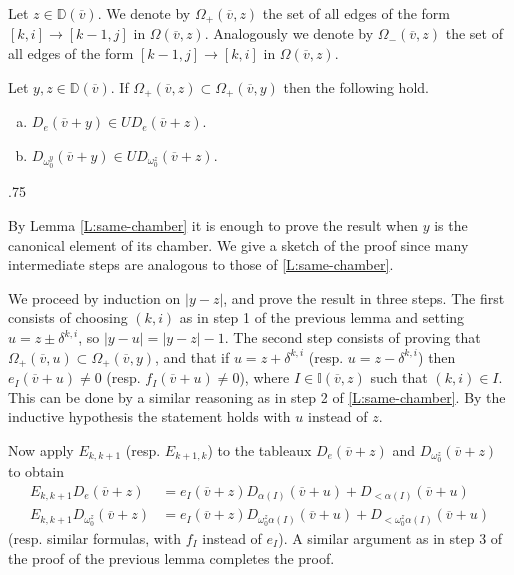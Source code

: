 \documentclass[11pt,fleqn]{amsart}
\makeatletter
\renewcommand\proofname{Proof}
\renewenvironment{proof}[1][\textit{\proofname}]{\par
 \pushQED{\qed}%
 \normalfont \topsep.75\paraskip\relax
 \trivlist
 \item[\hskip\labelsep
 \itshape
 #1\@addpunct{.}]\ignorespaces
}{%
 \popQED\endtrivlist\@endpefalse
}
\newcounter{para}[section]
\newcommand\vv{\overline{v}}
\newcommand\II{\mathbb I}
\newcommand\DD{\mathbb D}
\makeatother
\begin{document}
Let $z \in \DD(\vv)$. We denote by $\Omega_+(\vv, z)$ the set of all edges of 
the form $[k,i] \rightarrow [k-1,j]$ in $\Omega(\vv, z)$. Analogously we 
denote by $\Omega_-(\vv, z)$ the set of all edges of the form $[k-1,j] 
\rightarrow [k,i]$ in $\Omega(\vv, z)$. 

\begin{Lemma}
\label{L:omega-contained}
Let $y,z \in \DD(\vv)$. If $\Omega_+(\vv,z) \subset \Omega_+(\vv,y)$ then the
following hold.
\begin{enumerate}[(a)]
\item 
\label{i:e}
$D_{e}(\vv + y) \in U D_{e}(\vv + z)$.

\item 
\label{i:omega}
$D_{\omega_0^y}(\vv + y) \in U D_{\omega_0^z}(\vv + z)$.
\end{enumerate}
\end{Lemma}
\begin{proof}
By Lemma \ref{L:same-chamber} it is enough to prove the result when $y$ is the 
canonical element of its chamber. We give a sketch of the proof since many 
intermediate steps are analogous to those of \ref{L:same-chamber}. 

We proceed by induction on $|y-z|$, and prove the result in three steps. The 
first consists of choosing $(k,i)$ as in step 1 of the previous lemma and 
setting $u = z \pm \delta^{k,i}$, so $|y-u| = |y-z| - 1$. The second step 
consists of proving that $\Omega_+(\vv,u) \subset \Omega_+(\vv,y)$, and that
if $u = z + \delta^{k,i}$ (resp. $u = z - \delta^{k,i}$) then $e_I(\vv+u) \neq
0$ (resp. $f_I(\vv + u) \neq 0$), where $I \in \II(\vv,z)$ such that $(k,i)
\in I$. This can be done by a similar reasoning as in step 2 of 
\ref{L:same-chamber}. By the inductive hypothesis the statement holds with $u$
instead of $z$. 

Now apply $E_{k,k+1}$ (resp. $E_{k+1,k}$) to the tableaux $D_e(\vv + z)$ and 
$D_{\omega_0^z}(\vv+z)$ to obtain
\begin{align*}
E_{k,k+1} D_e(\vv + z) 
	&= e_I(\vv + z) D_{\alpha(I)}(\vv + u) + D_{< \alpha(I)}(\vv+u) \\
E_{k,k+1} D_{\omega_0^z}(\vv + z) 
	&= e_I(\vv + z) D_{\omega_0^z \alpha(I)}(\vv + u) + 
		D_{<\omega_0^z \alpha(I)}(\vv + u)
\end{align*}
(resp. similar formulas, with $f_I$ instead of $e_I$). A similar argument as in
step 3 of the proof of the previous lemma completes the proof.
\end{proof}
\end{document}
